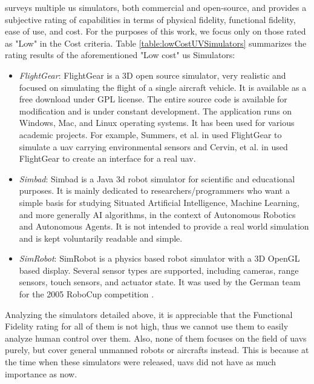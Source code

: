 \cite{craighead2007survey} surveys multiple \gls{us} simulators, both commercial and open-source, and provides a subjective rating of capabilities in terms of physical fidelity, functional fidelity, ease of use, and cost. For the purposes of this work, we focus only on those rated as "Low" in the Cost criteria. Table \ref{table:lowCostUVSimulators} summarizes the rating results of the aforementioned "Low cost" \gls{us} Simulators:

\begin{itemize}
\item \emph{FlightGear}: FlightGear \cite{flightGear} is a 3D open source simulator, very realistic and focused on simulating the flight of a single aircraft vehicle. It is available as a free download under GPL license. The entire source code is available for modification and is under constant development. The application runs on Windows, Mac, and Linux operating systems. It has been used for various academic projects. For example, Summers, et al. in \cite{summers2002determination} used FlightGear to simulate a \gls{uav} carrying environmental sensors and Cervin, et al. in \cite{cervin20043d} used FlightGear to create an interface for a real \gls{uav}.

\item \emph{Simbad}: Simbad \cite{simbad} is a Java 3d robot simulator for scientific and educational purposes. It is mainly dedicated to researchers/programmers who want a simple basis for studying Situated Artificial Intelligence, Machine Learning, and more generally AI algorithms, in the context of Autonomous Robotics and Autonomous Agents. It is not intended to provide a real world simulation and is kept voluntarily readable and simple.

\item \emph{SimRobot}: SimRobot \cite{simrobot} is a physics based robot simulator with a 3D OpenGL based display. Several sensor types are supported, including cameras, range sensors, touch 
sensors, and actuator state. It was used by the German team for the 2005 RoboCup competition \cite{laue2006simrobot}.
\end{itemize}

Analyzing the simulators detailed above, it is appreciable that the Functional Fidelity rating for all of them is not high, thus we cannot use them to easily analyze human control over them. Also, none of them focuses on the field of \glspl{uav} purely, but cover general unmanned robots or aircrafts instead. This is because at the time when these simulators were released, \glspl{uav} did not have as much importance as now.

